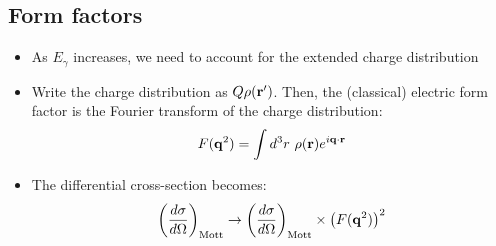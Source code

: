 \subsection{Form factors}
\begin{itemize}
  \item As $E_\gamma$ increases, we need to account for the extended charge distribution
  \item Write the charge distribution as $Q\rho(\mathbf{r}')$. Then, the (classical) electric form factor is the Fourier transform of the charge distribution:
  \begin{equation}
    F(\mathbf{q}^2) = \int d^3r~\rho(\mathbf{r}) e^{i\mathbf{q}\cdot\mathbf{r}}
  \end{equation}
  \item The differential cross-section becomes:
  \begin{equation}
    \left(\dfrac{d \sigma}{d \Omega}\right)_\text{Mott} \rightarrow \left(\dfrac{d \sigma}{d \Omega}\right)_\text{Mott} \times \left(F(\mathbf{q}^2)\right)^2
  \end{equation}
\end{itemize}

